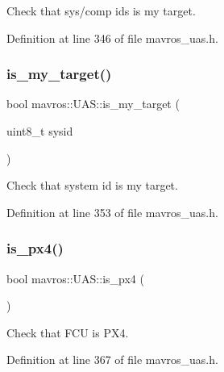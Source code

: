 Check that sys/comp id\textquotesingle{}s is my target. 



Definition at line 346 of file mavros\+\_\+uas.\+h.

\mbox{\label{group__nodelib_gaed7b8a1d25613984a83837958b0dde67}} 
\subsubsection{\texorpdfstring{is\_my\_target()}{is\_my\_target()}\hspace{0.1cm}{\footnotesize\ttfamily [2/2]}}
{\footnotesize\ttfamily bool mavros\+::\+U\+A\+S\+::is\+\_\+my\+\_\+target (\begin{DoxyParamCaption}\item[{uint8\+\_\+t}]{sysid }\end{DoxyParamCaption})\hspace{0.3cm}{\ttfamily [inline]}}



Check that system id is my target. 



Definition at line 353 of file mavros\+\_\+uas.\+h.

\mbox{\label{group__nodelib_ga03c6f1128530da35612a7d40eb5cb5ad}} 
\subsubsection{\texorpdfstring{is\_px4()}{is\_px4()}}
{\footnotesize\ttfamily bool mavros\+::\+U\+A\+S\+::is\+\_\+px4 (\begin{DoxyParamCaption}{ }\end{DoxyParamCaption})\hspace{0.3cm}{\ttfamily [inline]}}



Check that F\+CU is P\+X4. 



Definition at line 367 of file mavros\+\_\+uas.\+h.

\mbox{\label{group__nodelib_ga0f57da8dc483d45ac139607498cb5de4}} 
